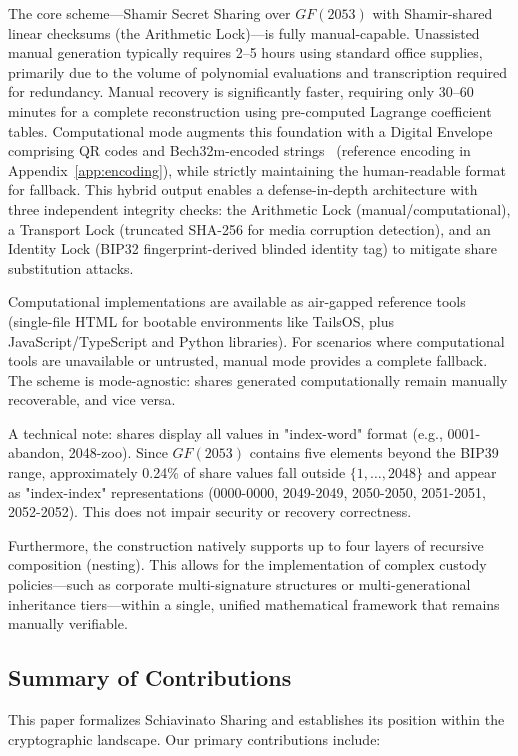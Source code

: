 \documentclass[11pt]{article}
\begin{document}
The core scheme---Shamir Secret Sharing over $GF(2053)$ with Shamir-shared linear checksums (the Arithmetic Lock)---is fully manual-capable. Unassisted manual generation typically requires 2--5 hours using standard office supplies, primarily due to the volume of polynomial evaluations and transcription required for redundancy. Manual recovery is significantly faster, requiring only 30--60 minutes for a complete reconstruction using pre-computed Lagrange coefficient tables. Computational mode augments this foundation with a Digital Envelope comprising QR codes and Bech32m-encoded strings~\cite{bip350} (reference encoding in Appendix~\ref{app:encoding}), while strictly maintaining the human-readable format for fallback. This hybrid output enables a defense-in-depth architecture with three independent integrity checks: the Arithmetic Lock (manual/computational), a Transport Lock (truncated SHA-256 for media corruption detection), and an Identity Lock (BIP32 fingerprint-derived blinded identity tag) to mitigate share substitution attacks.

Computational implementations are available as air-gapped reference tools (single-file HTML for bootable environments like TailsOS, plus JavaScript/TypeScript and Python libraries). For scenarios where computational tools are unavailable or untrusted, manual mode provides a complete fallback. The scheme is mode-agnostic: shares generated computationally remain manually recoverable, and vice versa.

A technical note: shares display all values in "index-word" format (e.g., 0001-abandon, 2048-zoo). Since $GF(2053)$ contains five elements beyond the BIP39 range, approximately 0.24\% of share values fall outside $\{1, \ldots, 2048\}$ and appear as "index-index" representations (0000-0000, 2049-2049, 2050-2050, 2051-2051, 2052-2052). This does not impair security or recovery correctness.

Furthermore, the construction natively supports up to four layers of recursive composition (nesting). This allows for the implementation of complex custody policies---such as corporate multi-signature structures or multi-generational inheritance tiers---within a single, unified mathematical framework that remains manually verifiable.

\subsection{Summary of Contributions}

This paper formalizes Schiavinato Sharing and establishes its position within the cryptographic landscape. Our primary contributions include:
\end{document}

